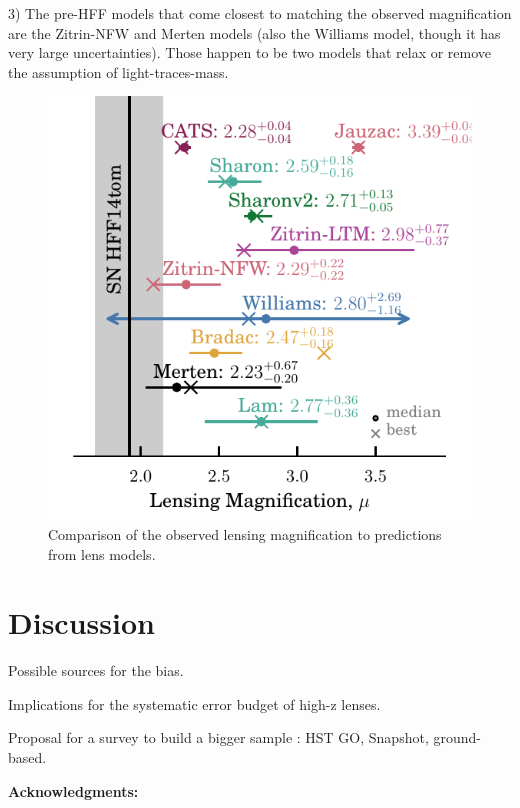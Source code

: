 3) The pre-HFF models that come closest to matching the observed magnification are the Zitrin-NFW and Merten models (also the Williams model, though it has very large uncertainties).  Those happen to be two models that relax or remove the assumption of light-traces-mass.  


\begin{figure}
\begin{center}
\includegraphics[width=\columnwidth]{FIG/lensing_test}
\caption{ 
Comparison of the observed lensing magnification to predictions from
lens models.
\label{fig:lensingtest} }
\end{center}
\end{figure}


\section{Discussion}

Possible sources for the bias. 

Implications for the systematic error budget of high-z lenses.

Proposal for a survey to build a bigger sample : HST GO, Snapshot, ground-based.

\bigskip


{\bf Acknowledgments:}


